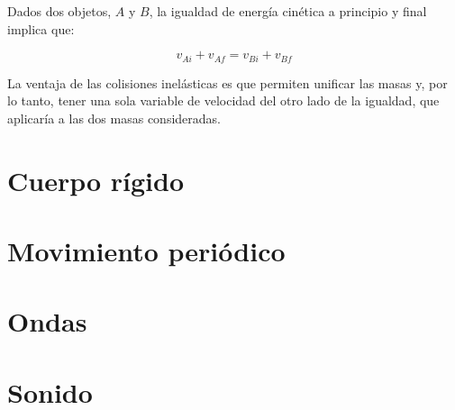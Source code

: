 \documentclass[12pt]{article}
\begin{document}
Dados dos objetos, \(A\) y \(B\), 
la igualdad de energía cinética a principio y final implica que:

\begin{equation}
	v_{Ai} + v_{Af} = v_{Bi} + v_{Bf}
\end{equation}

La ventaja de las colisiones inelásticas es que permiten unificar las masas y,
por lo tanto, tener una sola variable de velocidad del otro lado de la igualdad,
que aplicaría a las dos masas consideradas.

\pagebreak

\section{Cuerpo rígido}

\pagebreak

\section{Movimiento periódico}

\pagebreak

\section{Ondas}

\pagebreak

\section{Sonido}
\end{document}
